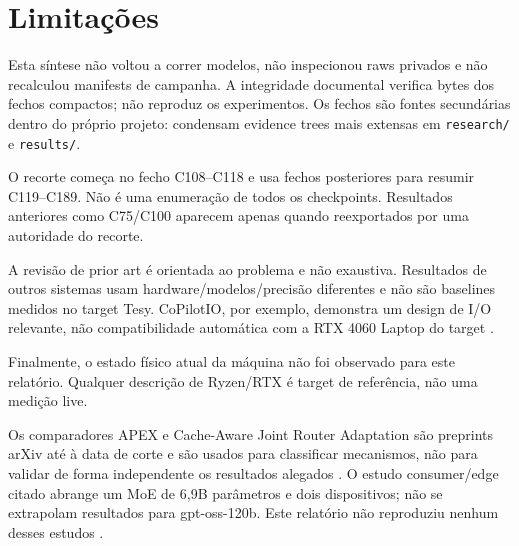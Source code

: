 \section{Limitações}
Esta síntese não voltou a correr modelos, não inspecionou raws privados e não recalculou manifests de campanha. A integridade documental verifica bytes dos fechos compactos; não reproduz os experimentos. Os fechos são fontes secundárias dentro do próprio projeto: condensam evidence trees mais extensas em \texttt{research/} e \texttt{results/}.

O recorte começa no fecho C108--C118 e usa fechos posteriores para resumir C119--C189. Não é uma enumeração de todos os checkpoints. Resultados anteriores como C75/C100 aparecem apenas quando reexportados por uma autoridade do recorte.

A revisão de prior art é orientada ao problema e não exaustiva. Resultados de outros sistemas usam hardware/modelos/precisão diferentes e não são baselines medidos no target Tesy. CoPilotIO, por exemplo, demonstra um design de I/O relevante, não compatibilidade automática com a RTX 4060 Laptop do target \cite{chen2026copilotio}.

Finalmente, o estado físico atual da máquina não foi observado para este relatório. Qualquer descrição de Ryzen/RTX é target de referência, não uma medição live.

Os comparadores APEX e Cache-Aware Joint Router Adaptation são preprints arXiv até à data de corte e são usados para classificar mecanismos, não para validar de forma independente os resultados alegados \cite{kanani2026apex,wu2026cacheaware}. O estudo consumer/edge citado abrange um MoE de 6,9B parâmetros e dois dispositivos; não se extrapolam resultados para gpt-oss-120b. Este relatório não reproduziu nenhum desses estudos \cite{alfarizy2026consumer}.
